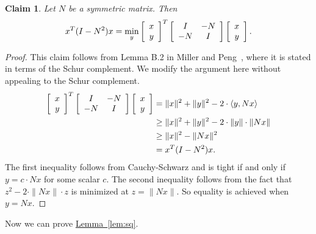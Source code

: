 \documentclass[11pt]{article}
\numberwithin{equation}{section}
\newtheorem{claim}[theorem]{Claim}
\theoremstyle{definition}
\theoremstyle{plain}
\newcommand{\expref}[2]{\hyperref[#2]{#1~\ref{#2}}}
\numberwithin{myalgctr}{section}
\theoremstyle{named}
\begin{document}
\begin{claim}
\label{claim3}
Let $N$ be a symmetric matrix. Then
\[
x^T(I-N^{2})x = \min_{y}\left[
\begin{array}{c}
x \\
y
\end{array}\right]^{T}\left[
\begin{array}{c c}
I & -N \\
-N & I
\end{array}
\right]\left[
\begin{array}{c}
x \\
y
\end{array}\right] .
\]
\end{claim}
\begin{proof}
This claim follows from Lemma B.2 in Miller and Peng~\cite{miller2013approximate}, where it is stated in terms of the Schur complement. We modify the argument here without appealing to the Schur complement. 
\begin{align*}
\left[
\begin{array}{c}
x \\
y
\end{array}\right]^{T}\left[
\begin{array}{c c}
I & -N \\
-N & I
\end{array}
\right]\left[
\begin{array}{c}
x \\
y
\end{array}\right]  &= \|x\|^2 + \|y\|^2 - 2\cdot  \langle {y,Nx}\rangle\\
&\geq \|x\|^2 + \|y\|^2 - 2\cdot \|y\|\cdot \|Nx\| \\
&\geq \|x\|^2 - \|Nx\|^2 \\
&=x^{T}(I-N^2)x.
\end{align*}
The first inequality follows from Cauchy-Schwarz and is tight if and only if $y=c\cdot Nx$ for some scalar $c$. The second inequality follows from the fact that $z^2-2\cdot\|Nx\|\cdot z$ is minimized at $z=\|Nx\|$. So equality is achieved when $y=Nx$.
\end{proof}
Now we can prove \expref{Lemma}{lem:sq}.
\end{document}
